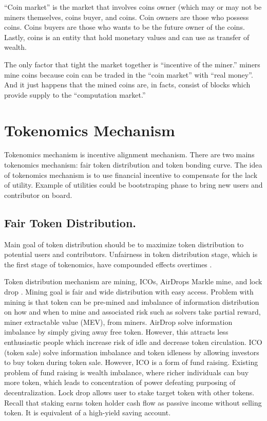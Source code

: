 \documentclass{IEEEtran}
\begin{document}
\begin{enumerate}
``Coin market'' is the market that involves coins owner (which may or may not be miners themselves, coins buyer, and coins. Coin owners are those who possess coins. Coins buyers are those who wants to be the future owner of the coins. Lastly, coins is an entity that hold monetary values and can use as transfer of wealth.

The only factor that tight the market together is ``incentive of the miner.'' miners mine coins because coin can be traded in the ``coin market'' with ``real money''. And it just happens that the mined coins are, in facts, consist of blocks which provide supply to the ``computation market.''
\end{enumerate}

\section{Tokenomics Mechanism}
\label{sec:org4f1198a}
Tokenomics mechanism is incentive alignment mechanism. There are two mains tokenomics mechanism: fair token distribution and token bonding curve. The idea of tokenomics mechanism is to use financial incentive to compensate for the lack of utility. Example of utilities could be bootstraping phase to bring new users and contributor on board.

\subsection{Fair Token Distribution.}
\label{sec:org2333947}
Main goal of token distribution should be to maximize token distribution to potential users and contributors. Unfairness in token distribution stage, which is the first stage of tokenomics, have compounded effects overtimes \cite{daly2019why}.

Token distribution mechanism are mining, ICOs, AirDrops Markle mine, and lock drop \cite{daly2019why} .
Mining goal is fair and wide distribution with easy access. Problem with mining is that token can be pre-mined and imbalance of information distribution on how and when to mine and associated risk such as solvers take partial reward, miner extractable value (MEV), from miners. AirDrop solve information imbalance by simply giving away free token. However, this attracts less enthusiastic people which increase risk of idle and decrease token circulation. ICO (token sale) solve information imbalance and token idleness by allowing investors to buy token during token sale. However, ICO is a form of fund raising. Existing problem of fund raising is wealth imbalance, where richer individuals can buy more token, which leads to concentration of power defeating purposing of decentralization. Lock drop allows user to stake target token with other tokens. Recall that staking earns token holder cash flow as passive income without selling token. It is equivalent of a high-yield saving account.
\end{document}
